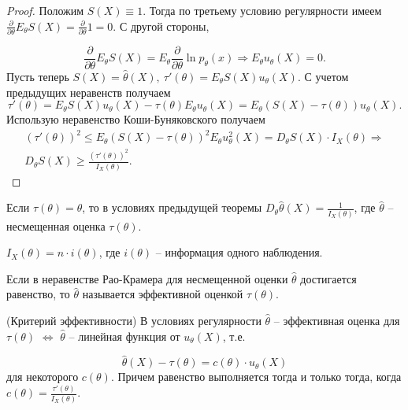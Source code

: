 \begin{proof}
Положим $\displaystyle S( X) \equiv 1$. Тогда по третьему условию регулярности имеем $\displaystyle \frac{\partial }{\partial \theta } E_{\theta } S( X) =\frac{\partial }{\partial \theta } 1=0$. С другой стороны,


\begin{equation*}
\frac{\partial }{\partial \theta } E_{\theta } S( X) =E_{\theta }\frac{\partial }{\partial \theta }\ln p_{\theta }( x) \Rightarrow E_{\theta } u_{\theta }( X) =0.
\end{equation*}
Пусть теперь $\displaystyle S( X) =\hat{\theta }( X),\ \tau '( \theta ) =E_{\theta } S( X) u_{\theta }( X)$. С учетом предыдущих неравенств получаем
\begin{equation*}
\tau '( \theta ) =E_{\theta } S( X) u_{\theta }( X) -\tau ( \theta ) E_{\theta } u_{\theta }( X) =E_{\theta }( S( X) -\tau ( \theta )) u_{\theta }( X) .
\end{equation*}
Использую неравенство Коши-Буняковского получаем
\begin{gather*}
( \tau '( \theta ))^{2} \leqslant E_{\theta }( S( X) -\tau ( \theta ))^{2} E_{\theta } u_{\theta }^{2}( X) =D_{\theta } S( X) \cdotp I_{X}( \theta ) \Rightarrow \\
D_{\theta } S( X) \geqslant \frac{( \tau '( \theta ))^{2}}{I_{X}( \theta )} .
\end{gather*}
\end{proof}
\begin{corollary}
Если $\displaystyle \tau ( \theta ) =\theta $, то в условиях предыдущей теоремы $\displaystyle D_{\theta }\hat{\theta }( X) =\frac{1}{I_{X}( \theta )}$, где $\displaystyle \hat{\theta }$ -- несмещенная оценка $\displaystyle \tau ( \theta )$.
\end{corollary}
\begin{exercise}
$\displaystyle I_{X}( \theta ) =n\cdotp i( \theta )$, где $\displaystyle i( \theta )$ -- информация одного наблюдения.
\end{exercise}
\begin{definition}
Если в неравенстве Рао-Крамера для несмещенной оценки $\displaystyle \hat{\theta }$ достигается равенство, то $\displaystyle \hat{\theta }$ называется эффективной оценкой $\displaystyle \tau ( \theta )$.
\end{definition}
\begin{theorem}
(Критерий эффективности) В условиях регулярности $\displaystyle \hat{\theta }$ -- эффективная оценка для $\displaystyle \tau ( \theta )$ $\displaystyle \Leftrightarrow $ $\displaystyle \hat{\theta }$ -- линейная функция от $\displaystyle u_{\theta }( X)$, т.е.


\begin{equation*}
\hat{\theta }( X) -\tau ( \theta ) =c( \theta ) \cdotp u_{\theta }( X)
\end{equation*}
для некоторого $\displaystyle c( \theta )$. Причем равенство выполняется тогда и только тогда, когда $\displaystyle c( \theta ) =\frac{\tau '( \theta )}{I_{X}( \theta )}$.
\end{theorem}
